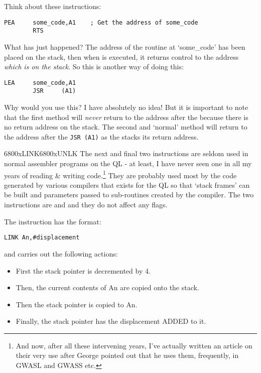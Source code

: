 Think about these instructions:

\begin{lstlisting}[firstnumber=1,]
        PEA     some_code,A1    ; Get the address of some_code
        RTS
\end{lstlisting}

What has just happened? The address of the routine at `some\_code'
      has been placed on the stack, then when  is executed, it returns
      control to the address \emph{which is on the stack}. So this is another way of
      doing this:

\begin{lstlisting}[firstnumber=1,]
        LEA     some_code,A1
        JSR     (A1)
\end{lstlisting}

Why would you use this? I have absolutely no idea! But it is
      important to note that the first method will \emph{never} return to the address
      after the  because there is no return address on the stack. The
    second and `normal' method will return to the address after the \lstinline{JSR (A1)}
      as the  stacks its return address.

\mc6800x{LINK}\mc6800x{UNLK}
The next and final two instructions are seldom used in normal
      assembler programs on the QL -{} at least, I have never seen one in all my
      years of reading \& writing code.\footnote{And now, after all these intervening years, I've actually written an article on their very use after George pointed out that he uses them, frequently, in GWASL and GWASS etc.} They are probably used most by the
      code generated by various compilers that exists for the QL so that
      `stack frames' can be built and parameters passed to sub-{}routines
      created by the compiler. The two instructions are  and  and they
      do not affect any flags.

The  instruction has the format:

\begin{lstlisting}[firstnumber=1,]
        LINK An,#displacement
\end{lstlisting}

and carries out the following actions:
\begin{itemize}[itemsep=0pt]

\item{}First the stack pointer is decremented by 4.


\item{}Then, the current contents of An are copied onto the
          stack.


\item{}Then the stack pointer is copied to An.


\item{}Finally, the stack pointer has the displacement ADDED to
          it.

\end{itemize}

